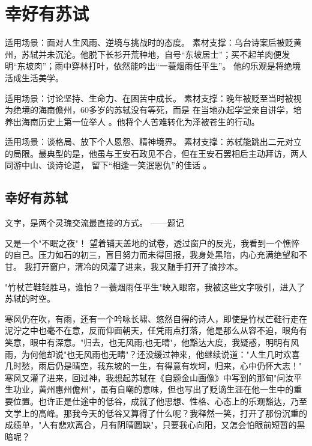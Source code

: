 \section{幸好有苏试}


\begin{tcolorbox}[colback=blue!5, colframe=blue!50, title=主题一：旷达乐观的处世哲学]
适用场景：面对人生风雨、逆境与挑战时的态度。
素材支撑：乌台诗案后被贬黄州，苏轼并未沉沦。他脱下长衫开荒种地，自号“东坡居士”；买不起羊肉便发明“东坡肉”；雨中穿林打叶，依然能吟出“一蓑烟雨任平生”。 他的乐观是将绝境活成生活美学。
\end{tcolorbox}

\begin{tcolorbox}[colback=green!5, colframe=green!50, title=主题二：坚韧不拔的生命韧性]
适用场景：讨论坚持、生命力、在困苦中成长。
素材支撑：晚年被贬至当时被视为绝境的海南儋州，60多岁的苏轼没有等死，而是 在当地办起学堂亲自讲学，培养出海南历史上第一位举人 。他将个人苦难转化为泽被苍生的行动。
\end{tcolorbox}

\begin{tcolorbox}[colback=orange!5, colframe=orange!50, title=主题三：破茧成蝶的思想格局]
适用场景：谈格局、放下个人恩怨、精神境界。
素材支撑：苏轼能跳出二元对立的局限。最典型的是，他虽与王安石政见不合，但在王安石罢相后主动拜访，两人同游中山、谈诗论道， 留下“相逢一笑泯恩仇”的佳话 。
\end{tcolorbox}


\subsection{幸好有苏轼}

文字，是两个灵瑰交流最直接的方式。
——题记

又是一个"不眠之夜"！
望着铺天盖地的试卷，透过窗户的反光，我看到一个憔悴的自己。压力如石的初三，盲目努力而未得回报，我身处黑暗，内心充满绝望和不甘。
我打开窗户，清冷的风灌了进来，我又随手打开了摘抄本。

"竹杖芒鞋轻胜马，谁怕？一蓑烟雨任平生"映入眼帘，我被这些文字吸引，进入了苏轼的时空。

寒风仍在吹，有雨，还有一个吟咏长啸、悠然自得的诗人，即使是竹杖芒鞋行走在泥泞之中也毫不在意，反而仰面朝天，任凭雨点打落，他是那么从容不迫，眼角有笑意，眼中有深意。"归去，也无风雨;也无晴"，他豁达大度，我疑惑，明明有风雨，为何他却说"也无风雨也无睛"？还没缓过神来，他继续说道："人生几时欢喜几时愁，雨后仍是晴空，我东坡的一生，有得意有坎坷，归来，心中仍怀大志！"
寒风又灌了进来，回过神，我想起苏轼在《自题金山画像》中写到的那甸"问汝平生功业，黄州惠州儋州"，虽有自嘲的意味，但也写出了贬谪生涯在他一生中的重要位置。也许正是仕途中的低谷，成就了他思想、性格、心态上的乐观豁达，乃至文学上的高峰。那我今天的低谷又算得了什么呢？我释然一笑，打开了那份沉重的成绩单，"人有悲欢离合，月有阴晴圆缺"，只要我心向阳，又怎会怕眼前短暂的黑暗呢？

